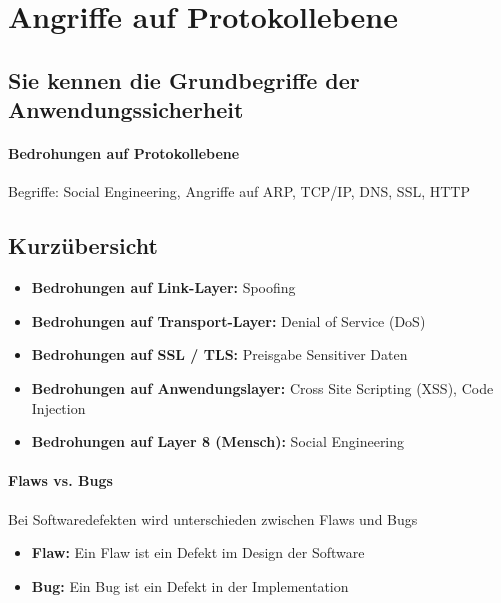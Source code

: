 \documentclass[10pt,a4paper]{article}
\begin{document}
\section{Angriffe auf Protokollebene}
\subsection*{Sie kennen die Grundbegriffe der Anwendungssicherheit}
\paragraph*{Bedrohungen auf Protokollebene}Begriffe: Social Engineering, Angriffe auf ARP, TCP/IP, DNS, SSL, HTTP

\subsection*{Kurzübersicht}
\begin{itemize}[noitemsep,topsep=0pt,leftmargin=*]
    \item \textbf{Bedrohungen auf Link-Layer:} Spoofing
    \item \textbf{Bedrohungen auf Transport-Layer:} Denial of Service (DoS)
    \item \textbf{Bedrohungen auf SSL / TLS:} Preisgabe Sensitiver Daten
    \item \textbf{Bedrohungen auf Anwendungslayer:} Cross Site Scripting (XSS), Code Injection
    \item \textbf{Bedrohungen auf Layer 8 (Mensch):} Social Engineering
\end{itemize}

\paragraph*{Flaws vs. Bugs} Bei Softwaredefekten wird unterschieden zwischen Flaws und Bugs
\begin{itemize}[noitemsep,topsep=0pt,leftmargin=*]
    \item \textbf{Flaw:} Ein Flaw ist ein Defekt im Design der Software
    \item \textbf{Bug:} Ein Bug ist ein Defekt in der Implementation
\end{itemize}
\end{document}
